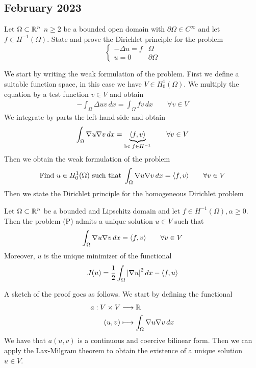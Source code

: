 \newpage
\subsection{February 2023}
\begin{exercise}
    Let \(\Omega \subset \mathbb{R}^n\) \(n \geq 2\) be a bounded open domain with \(\partial\Omega \in C^\infty\) and let \(f \in H^{-1}(\Omega)\). State and prove the Dirichlet principle for the problem
    \[
        \begin{cases}
            -\Delta u = f & \Omega \\
            u = 0 & \partial\Omega
        \end{cases}
        \tag*{(P)}
    \]
\end{exercise}
We start by writing the weak formulation of the problem. First we define a suitable function space, in this case we have \(V \in H^1_0(\Omega)\). We multiply the equation by a test function \(v \in V\) and obtain
\[
    \begin{split}
        -\int_\Omega \Delta u v \, dx = \int_\Omega f v \, dx \qquad \forall v \in V
    \end{split}
\]
We integrate by parts the left-hand side and obtain
\[
    \begin{split}
        \int_\Omega \nabla u \nabla v \, dx = \underbrace{\langle f, v \rangle}_{\text{bc } f \in H^{-1}} \qquad \forall v \in V
    \end{split}
\]
Then we obtain the weak formulation of the problem
\[
    \begin{split}
        \text{Find } u \in H^1_0(\Omega) \text{ such that } \int_\Omega \nabla u \nabla v \, dx =  \langle f, v \rangle \qquad \forall v \in V
    \end{split}
\]
Then we state the Dirichlet principle for the homogeneous Dirichlet problem
\begin{remark}
    Let \(\Omega \subset \mathbb{R}^n\) be a bounded and Lipschitz domain and let \(f \in H^{-1}(\Omega), \alpha \geq 0\). Then the problem (P) admits a unique solution \(u \in V\) such that 
    \[
        \int_\Omega \nabla u \nabla v \, dx = \langle f, v \rangle \qquad \forall v \in V
    \]
    Moreover, \(u\) is the unique minimizer of the functional
    \[
        J(u) = \frac{1}{2} \int_\Omega \abs{\nabla u}^2 \, dx - \langle f, u \rangle
    \]
\end{remark}
A sketch of the proof goes as follows. We start by defining the functional
\begin{align*}
    a: V \times V &\longrightarrow \mathbb{R} \\
    (u, v) &\longmapsto \int_\Omega \nabla u \nabla v \, dx
\end{align*}
We have that \(a(u,v)\) is a continuous and coercive bilinear form. Then we can apply the Lax-Milgram theorem to obtain the existence of a unique solution \(u \in V\).

